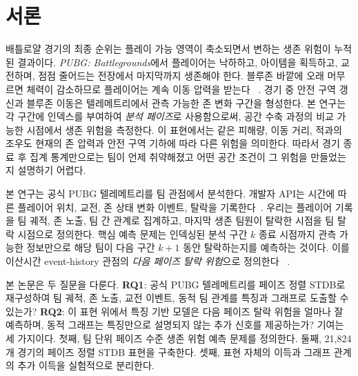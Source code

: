 \section{서론}

배틀로얄 경기의 최종 순위는 플레이 가능 영역이 축소되면서 변하는
생존 위험이 누적된 결과이다. \textit{PUBG: Battlegrounds}에서
플레이어는 낙하하고, 아이템을 획득하고, 교전하며, 점점 줄어드는
전장에서 마지막까지 생존해야 한다. 블루존 바깥에 오래 머무르면
체력이 감소하므로 플레이어는 계속 이동 압력을 받는다
~\cite{pubgGameInfo}. 경기 중 안전 구역 갱신과 블루존 이동은
텔레메트리에서 관측 가능한 존 변화 구간을 형성한다. 본 연구는
각 구간에 인덱스를 부여하여 \textit{분석 페이즈}로 사용함으로써, 공간 수축
과정의 비교 가능한 시점에서 생존 위험을 측정한다. 이 표현에서는 같은
피해량, 이동 거리, 적과의 조우도 현재의 존 압력과 안전 구역 기하에
따라 다른 위험을 의미한다. 따라서 경기 종료 후 집계 통계만으로는 팀이
언제 취약해졌고 어떤 공간 조건이 그 위험을 만들었는지 설명하기 어렵다.

본 연구는 공식 PUBG 텔레메트리를 팀 관점에서 분석한다. 개발자 API는
시간에 따른 플레이어 위치, 교전, 존 상태 변화 이벤트, 탈락을
기록한다~\cite{pubgDeveloperPortal,pubgTelemetryEvents,pubgTelemetryObjects}.
우리는 플레이어 기록을 팀 궤적, 존 노출, 팀 간 관계로 집계하고,
마지막 생존 팀원이 탈락한 시점을 팀 탈락 시점으로 정의한다. 핵심 예측
문제는 인덱싱된 분석 구간 \(k\) 종료 시점까지 관측 가능한 정보만으로
해당 팀이 다음 구간 \(k+1\) 동안 탈락하는지를 예측하는 것이다. 이를
이산시간 event-history 관점의 \textit{다음 페이즈 탈락 위험}으로 정의한다
~\cite{allison1982discrete,singer1993discrete}.

본 논문은 두 질문을 다룬다. \textbf{RQ1}: 공식 PUBG 텔레메트리를
페이즈 정렬 STDB로 재구성하여 팀 궤적, 존 노출, 교전 이벤트, 동적
팀 관계를 특징과 그래프로 도출할 수 있는가? \textbf{RQ2}: 이 표현
위에서 특징 기반 모델은 다음 페이즈 탈락 위험을 얼마나 잘 예측하며,
동적 그래프는 특징만으로 설명되지 않는 추가 신호를 제공하는가?
기여는 세 가지이다. 첫째, 팀 단위 페이즈 수준 생존 위험 예측 문제를
정의한다. 둘째, 21,824개 경기의 페이즈 정렬 STDB 표현을 구축한다.
셋째, 표현 자체의 이득과 그래프 관계의 추가 이득을 실험적으로
분리한다.

